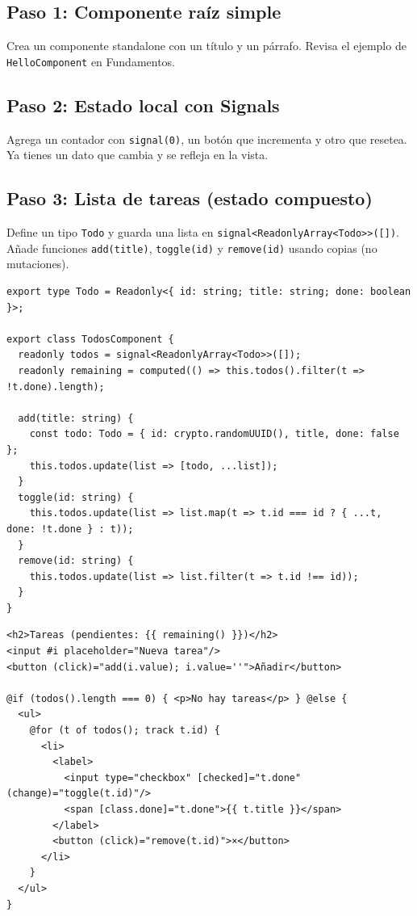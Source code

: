 \documentclass[11pt,a4paper]{article}
\begin{document}
\subsection{Paso 1: Componente raíz simple}
Crea un componente standalone con un título y un párrafo. Revisa el ejemplo de \texttt{HelloComponent} en Fundamentos.

\subsection{Paso 2: Estado local con Signals}
Agrega un contador con \texttt{signal(0)}, un botón que incrementa y otro que resetea. Ya tienes un dato que cambia y se refleja en la vista.

\subsection{Paso 3: Lista de tareas (estado compuesto)}
Define un tipo \texttt{Todo} y guarda una lista en \texttt{signal<ReadonlyArray<Todo>>([])}. Añade funciones \texttt{add(title)}, \texttt{toggle(id)} y \texttt{remove(id)} usando copias (no mutaciones).

\begin{lstlisting}[style=tsstyle, caption={Mini store local de Tareas con Signals}]
export type Todo = Readonly<{ id: string; title: string; done: boolean }>; 

export class TodosComponent {
  readonly todos = signal<ReadonlyArray<Todo>>([]);
  readonly remaining = computed(() => this.todos().filter(t => !t.done).length);

  add(title: string) {
    const todo: Todo = { id: crypto.randomUUID(), title, done: false };
    this.todos.update(list => [todo, ...list]);
  }
  toggle(id: string) {
    this.todos.update(list => list.map(t => t.id === id ? { ...t, done: !t.done } : t));
  }
  remove(id: string) {
    this.todos.update(list => list.filter(t => t.id !== id));
  }
}
\end{lstlisting}

\begin{lstlisting}[style=htmlstyle, caption={Plantilla de tareas con @for y @if}]
<h2>Tareas (pendientes: {{ remaining() }})</h2>
<input #i placeholder="Nueva tarea"/>
<button (click)="add(i.value); i.value=''">Añadir</button>

@if (todos().length === 0) { <p>No hay tareas</p> } @else {
  <ul>
    @for (t of todos(); track t.id) {
      <li>
        <label>
          <input type="checkbox" [checked]="t.done" (change)="toggle(t.id)"/>
          <span [class.done]="t.done">{{ t.title }}</span>
        </label>
        <button (click)="remove(t.id)">×</button>
      </li>
    }
  </ul>
}
\end{lstlisting}
\end{document}

